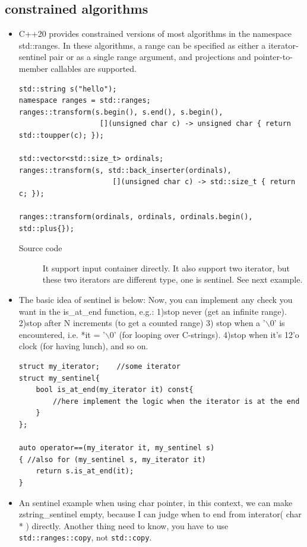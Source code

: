 \documentclass[a4paper,11pt,twoside]{book}
\begin{document}
\subsection{constrained algorithms}
\begin{itemize}
		\item C++20 provides constrained versions of most algorithms in the namespace std::ranges. In these algorithms, a range can be specified as either a iterator-sentinel pair or as a single range argument, and projections and pointer-to-member callables are supported. 
\begin{lstlisting}
std::string s("hello");
namespace ranges = std::ranges;
ranges::transform(s.begin(), s.end(), s.begin(),
                   [](unsigned char c) -> unsigned char { return std::toupper(c); });
 
std::vector<std::size_t> ordinals;
ranges::transform(s, std::back_inserter(ordinals),
                      [](unsigned char c) -> std::size_t { return c; });
 
ranges::transform(ordinals, ordinals, ordinals.begin(), std::plus{});
\end{lstlisting}
\begin{description}
		\item[Source code] It support input container directly. It also support two iterator, but these two iterators are different type, one is sentinel. See next example.
\end{description}

	\item The basic idea of sentinel is below:  Now, you can implement any check you want in the is\_at\_end function, e.g.: 1)stop never (get an infinite range). 2)stop after N increments (to get a counted range)
	3) stop when a '$\backslash$0' is encountered, i.e. *it = '$\backslash$0' (for looping over C-strings). 4)stop when it's 12'o clock (for having lunch), and so on.
	
\begin{lstlisting}
struct my_iterator;    //some iterator
struct my_sentinel{
	bool is_at_end(my_iterator it) const{
		//here implement the logic when the iterator is at the end
	}
};

auto operator==(my_iterator it, my_sentinel s)  
{ //also for (my_sentinel s, my_iterator it)
	return s.is_at_end(it); 
}
\end{lstlisting}

		\item An sentinel example when using char pointer, in this context, we can make zstring\_sentinel empty, because I can judge when to end from interator( char * ) directly. Another thing need to know, you have to use \texttt{std::ranges::copy}, not \texttt{std::copy}.
		

\end{itemize}
\end{document}
